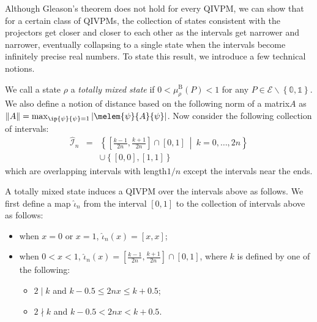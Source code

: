 \documentclass[english,reprint, aps, prl,superscriptaddress, showpacs,
showkeys, longbibliography, amsmath, amssymb]{revtex4-1}
\theoremstyle{plain}
\theoremstyle{definition}
\newcommand{\events}{\ensuremath{\mathcal{E}}}
\newcommand{\set}[2]{\ensuremath{\left\{ {#1}~\middle|~{#2}\right\} }}
\newcommand{\nb}{\nolinebreak[1] }
\begin{document}
Although Gleason's theorem does not hold for every QIVPM, we can show
that for a certain class of QIVPMs, the collection of states
consistent with the projectors get closer and closer to each other as
the intervals get narrower and narrower, eventually collapsing to a
single state when the intervals become infinitely precise real
numbers. To state this result, we introduce a few technical notions. 

We call a state $\rho$ a \emph{totally mixed state} if
$0<\mu_{\rho}^{\mathrm{B}}\left(P\right)<1$ for any
$P\in\events\backslash\left\{ \mathbb{0},\mathbb{1}\right\} $. We also
define a notion of distance based on the following norm of a
matrix\nb$A$ as
$\left\Vert A\right\Vert
=\max_{\ip{\psi}{\psi}=1}\left|\melem{\psi}{A}{\psi}\right|$\nb\citep{544199}. Now
consider the following collection of intervals:
\begin{eqnarray}
\widehat{\mathscr{I}}_{n} & = & \set{\left[\frac{k-1}{2n},\frac{k+1}{2n}\right]\cap\left[0,1\right]}{k=0,\ldots,2n}\nonumber \\
 &  & \cup\left\{ \left[0,0\right],\left[1,1\right]\right\} 
\end{eqnarray}
which are overlapping intervals with length\nb$1/n$ except the intervals
near the ends. 

A totally mixed state induces a QIVPM over the intervals above as
follows. We first define a map $\widehat{\iota}_{n}$ from the interval
$[0,1]$ to the collection of intervals above as follows:
\begin{itemize}
\item when $x=0$ or $x=1$, $\widehat{\iota}_{n}\left(x\right)=\left[x,x\right]$;
\item when $0<x<1$, $\widehat{\iota}_{n}\left(x\right)=\left[\frac{k-1}{2n},\frac{k+1}{2n}\right]\cap\left[0,1\right]$,
where $k$ is defined by one of the following:
\begin{itemize}
\item $2\mid k$ and $k-0.5\le2nx\le k+0.5$;
\item $2\nmid k$ and $k-0.5<2nx<k+0.5$.
\end{itemize}
\end{itemize}
\end{document}
